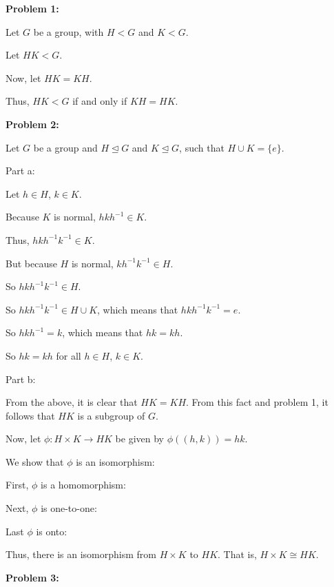 \documentclass[a4paper,12pt]{article}
\newcommand{\tab}{\hspace{4mm}} %
\newcommand{\shunt}{\vspace{20mm}}
\newcommand{\subgp}{\mathrel{\unlhd}}
\begin{document}
{\bf Problem 1:}

Let $G$ be a group, with $H<G$ and $K <G$.

Let $HK < G$.

\tab

Now, let $HK=KH$.

\tab 

Thus, $HK < G$ if and only if $KH=HK$.

\shunt

{\bf Problem 2:}

Let $G$ be a group and $H \subgp G$ and $K \subgp G$, such that $H \cup K = \{e\}$.

Part a:

Let $h \in H$, $k \in K$.

Because $K$ is normal, $hkh^{-1} \in K$.

Thus, $hkh^{-1}k^{-1} \in K$.

But because $H$ is normal, $kh^{-1}k^{-1} \in H$.

So $hkh^{-1}k^{-1} \in H$.

So $hkh^{-1}k^{-1} \in H \cup K$, which means that $hkh^{-1}k^{-1} = e$.

So $hkh^{-1} = k$, which means that $hk = kh$.

So $hk = kh$ for all $h \in H$, $k \in K$.

\shunt

Part b:

From the above, it is clear that $HK = KH$. From this fact and problem 1, it follows that $HK$ is a subgroup of $G$.

Now, let $\phi : H \times K \to HK$ be given by $\phi((h,k)) = hk$.

We show that $\phi$ is an isomorphism:

First, $\phi$ is a homomorphism:

\tab %

Next, $\phi$ is one-to-one:

\tab %

Last $\phi$ is onto:

\tab %

Thus, there is an isomorphism from $H \times K$ to $HK$. That is, $H \times K \cong HK$.

\shunt

{\bf Problem 3:}
\end{document}
